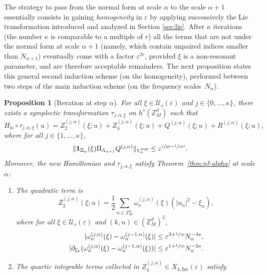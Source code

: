 \documentclass[10pt,a4paper]{amsart}
\theoremstyle{plain}
\newtheorem{proposition}[theorem]{Proposition}
\theoremstyle{definition}
\DeclareMathOperator{\lo}{lo}
\newcommand{\Z}{\mathbb{Z}}
\newcommand{\1}{\mathbf{1}}
\newcommand{\Ysup}[1]{Y_{#1}^{\mathrm{sup}}}
\let\epsilon\varepsilon
\begin{document}
The strategy to pass from the normal form at scale $\alpha$ to the scale $\alpha+1$ essentially consists in gaining {\it homogeneity} in $\epsilon$ by applying successively the Lie transformation introduced and analyzed in Section \ref{sec:lie}. After $\kappa$ iterations (the number $\kappa$ is comparable to a multiple of $r$) all the terms that are not under the normal form at scale $\alpha+1$ (namely, which contain unpaired indices smaller than $N_{\alpha+1}$) eventually come with a factor $\epsilon^{2r}$, provided $\xi$ is a non-resonant parameter, and are therefore acceptable remainders. The next proposition states this general second induction scheme (on the homogeneity), performed between two steps of the main induction scheme (on the frequency scales~$N_{\alpha}$).
\begin{proposition}[Iteration at step $\alpha$]
\label{prop:it-j}
For all $\xi\in\mathcal{U}_{s}(\epsilon)$ and $j\in\{0,\dots,\kappa\}$, there exists a symplectic transformation $\tau_{j,\alpha,\xi}$ on $h^{s}(\Z_{M}^{d})$ such that\vspace*{-3pt}
\[
H_{\lo}\circ\tau_{j,\alpha,\xi}(u)
=Z_{2}^{(j,\alpha)}(\xi;u) + Z_{4}^{(j,\alpha)}(\xi;u)+Q^{(j,\alpha)}(\xi;u)+R^{(j,\alpha)}(\xi;u),
\]
where for all $j\in\{1,\dots,\kappa\}$,\vspace*{-3pt}
\begin{equation}
\label{eq:it-alpha-2}
\|\mathbf{1}_{\Xi_{\alpha}}(\xi)\Pi_{\Lambda_{\alpha+1}}Q^{(j,\alpha)}\|_{\Ysup{\alpha}} \leq \epsilon^{\sfrac{j}{30}-\sfrac{1}{10^{4}}}.
\end{equation}
Moreover, the new Hamiltonian and $\tau_{j,\alpha,\xi}$ satisfy Theorem~\ref{thm:nf-alpha} at scale $\alpha$:
\begin{enumerate}
\item The quadratic term is\vspace*{-3pt}
\[
Z_{2}^{(j,\alpha)}(\xi;u) = \frac{1}{2}\sum_{n\in\Z_{M}^{d}}\omega_{n}^{(j,\alpha)}(\xi)(|u_n|^{2}-\xi_{n}),
\]
where for all $\xi\in\mathcal{U}_{s}(\epsilon)$ and $(k,n)\in(\Z_{M}^{d})^{2}$,\vspace*{-3pt}
\begin{align}
\label{eq:j-omega}
|\omega_{n}^{(j,\alpha)}(\xi)-\omega_{n}^{(j-1,\alpha)}(\xi)|
&\leq
\epsilon^{3+\sfrac{1}{10}}
N_{\alpha}^{-4s},\\
\label{eq:j-domega}
|
\partial_{\xi_{k}}
(\omega_{n}^{(j,\alpha)}(\xi) -
\omega_{n}^{(j-1,\alpha)}(\xi))
|
&\leq \epsilon^{1+\sfrac{1}{10}}N_{\alpha}^{-2s}.
\end{align}
\item The quartic integrable terms collected in $Z_{4}^{(j,\alpha)}\in X_{4,\mathrm{Int}}(\epsilon)$ satisfy\vspace*{-3pt}

\end{enumerate}
\end{proposition}
\end{document}
